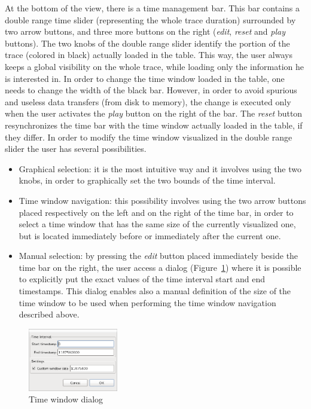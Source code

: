 \documentclass[twoside]{article}
\begin{document}
\begin{sloppypar}
At the bottom of the view, there is a time management bar.
This bar contains a double range time slider (representing the whole trace duration) surrounded by two arrow buttons, and three more buttons on the right (\emph{edit}, \emph{reset} and \emph{play} buttons).
The two knobs of the double range slider identify the portion of the trace (colored in black) actually loaded in the table.
This way, the user always keeps a global visibility on the whole trace, while loading only the information he is interested in.
In order to change the time window loaded in the table, one needs to change the width of the black bar. 
However, in order to avoid spurious and useless data transfers (from disk to memory), the change is executed only when the user activates the \emph{play} button on the right of the bar.
The \emph{reset} button resynchronizes the time bar with the time window actually loaded in the table, if they differ.
In order to modify the time window visualized in the double range slider the user has several possibilities. 
\begin{itemize}
 \item Graphical selection: it is the most intuitive way and it involves using the two knobs, in order to graphically set the two bounds of the time interval.
 \item Time window navigation: this possibility involves using the two arrow buttons placed respectively on the left and on the right of the time bar, in order to select a time window that has the same size of the currently visualized one, but is located immediately before or immediately after the current one.
 \item Manual selection: by pressing the \emph{edit} button placed immediately beside the time bar on the right, the user access a dialog (Figure~\ref{fig:window_dialog}) where it is possible to explicitly put the exact values of the time interval start and end timestamps. 
 This dialog enables also a manual definition of the size of the time window to be used when performing the time window navigation described above.
\end{itemize}

\begin{figure}[h!]
  \centering
    \includegraphics[width=0.35\textwidth]{images/window_dialog.png}
  \caption{Time window dialog}
  \label{fig:window_dialog}
\end{figure}


\end{sloppypar}
\end{document}
